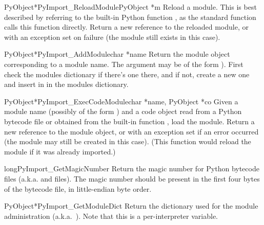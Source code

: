 \begin{cfuncdesc}{PyObject*}{PyImport_ReloadModule}{PyObject *m}
  Reload a module.  This is best described by referring to the
  built-in Python function , as
  the standard  function calls this function
  directly.  Return a new reference to the reloaded module, or \NULL{}
  with an exception set on failure (the module still exists in this
  case).
\end{cfuncdesc}

\begin{cfuncdesc}{PyObject*}{PyImport_AddModule}{char *name}
  Return the module object corresponding to a module name.  The
   argument may be of the form ).
  First check the modules dictionary if there's one there, and if not,
  create a new one and insert in in the modules dictionary.
\end{cfuncdesc}

\begin{cfuncdesc}{PyObject*}{PyImport_ExecCodeModule}{char *name, PyObject *co}
  Given a module name (possibly of the form ) and
  a code object read from a Python bytecode file or obtained from the
  built-in function , load
  the module.  Return a new reference to the module object, or \NULL{}
  with an exception set if an error occurred (the module may still be
  created in this case).  (This function would reload the module if it
  was already imported.)
\end{cfuncdesc}

\begin{cfuncdesc}{long}{PyImport_GetMagicNumber}{}
  Return the magic number for Python bytecode files
  (a.k.a.  and  files).  The magic number should
  be present in the first four bytes of the bytecode file, in
  little-endian byte order.
\end{cfuncdesc}

\begin{cfuncdesc}{PyObject*}{PyImport_GetModuleDict}{}
  Return the dictionary used for the module administration
  (a.k.a.\ ).  Note that this is a per-interpreter
  variable.
\end{cfuncdesc}

